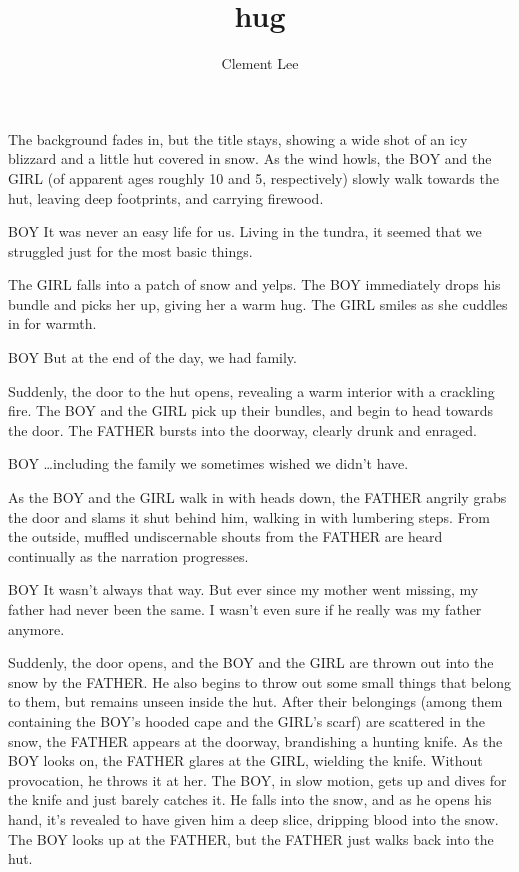 \documentclass{screenplay}
\title{hug}
\author{Clement Lee}
\begin{document}
\fadein
{}
The background fades in, but the title stays, showing a wide shot of an icy blizzard and a little hut covered in snow.
As the wind howls, the BOY and the GIRL (of apparent ages roughly 10 and 5, respectively) slowly walk towards the hut, leaving deep footprints, and carrying firewood.
\begin{dialogue}[in narration]{BOY}
  It was never an easy life for us.
  Living in the tundra, it seemed that we struggled just for the most basic things.
\end{dialogue}
The GIRL falls into a patch of snow and yelps.
The BOY immediately drops his bundle and picks her up, giving her a warm hug.
The GIRL smiles as she cuddles in for warmth.
\begin{dialogue}{BOY}
  But at the end of the day, we had family.
\end{dialogue}
Suddenly, the door to the hut opens, revealing a warm interior with a crackling fire.
The BOY and the GIRL pick up their bundles, and begin to head towards the door.
The FATHER bursts into the doorway, clearly drunk and enraged.
\begin{dialogue}{BOY}
  \ldots including the family we sometimes wished we didn't have.
\end{dialogue}
As the BOY and the GIRL walk in with heads down, the FATHER angrily grabs the door and slams it shut behind him, walking in with lumbering steps.
From the outside, muffled undiscernable shouts from the FATHER are heard continually as the narration progresses.
\begin{dialogue}{BOY}
  It wasn't always that way.
  But ever since my mother went missing, my father had never been the same.
  I wasn't even sure if he really was my father anymore.
\end{dialogue}
Suddenly, the door opens, and the BOY and the GIRL are thrown out into the snow by the FATHER.
He also begins to throw out some small things that belong to them, but remains unseen inside the hut.
After their belongings (among them containing the BOY's hooded cape and the GIRL's scarf) are scattered in the snow, the FATHER appears at the doorway, brandishing a hunting knife.
As the BOY looks on, the FATHER glares at the GIRL, wielding the knife.
Without provocation, he throws it at her.
The BOY, in slow motion, gets up and dives for the knife and just barely catches it.
He falls into the snow, and as he opens his hand, it's revealed to have given him a deep slice, dripping blood into the snow.
The BOY looks up at the FATHER, but the FATHER just walks back into the hut.
\end{document}
